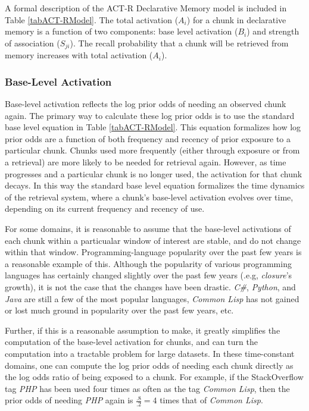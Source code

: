 \documentclass[man]{apa6}
\begin{document}
A formal description of the ACT-R Declarative Memory model is included in Table \ref{tabACT-RModel}.
The total activation ($A_{i}$) for a chunk in declarative memory is a function of two components: base level activation ($B_{i}$) and strength of association ($S_{ji}$).
The recall probability that a chunk will be retrieved from memory increases with total activation ($A_{i}$).

\subsubsection{Base-Level Activation}

Base-level activation reflects the log prior odds of needing an observed chunk again.
The primary way to calculate these log prior odds is to use the standard base level equation in Table \ref{tabACT-RModel}.
This equation formalizes how log prior odds are a function of both frequency and recency of prior exposure to a particular chunk.
Chunks used more frequently (either through exposure or from a retrieval) are more likely to be needed for retrieval again.
However, as time progresses and a particular chunk is no longer used, the activation for that chunk decays.
In this way the standard base level equation formalizes the time dynamics of the retrieval system, where a chunk's base-level activation evolves over time, depending on its current frequency and recency of use.

For some domains, it is reasonable to assume that the base-level activations of each chunk within a particualar window of interest are stable, and do not change within that window.
Programming-language popularity over the past few years is a reasonable example of this.
Although the popularity of various programming languages has certainly changed slightly over the past few years (.e.g, \emph{closure}'s growth), it is not the case that the changes have been drastic.
\emph{C\#}, \emph{Python}, and \emph{Java} are still a few of the most popular languages, \emph{Common Lisp} has not gained or lost much ground in popularity over the past few years, etc.

Further, if this is a reasonable assumption to make, it greatly simplifies the computation of the base-level activation for chunks, and can turn the computation into a tractable problem for large datasets.
In these time-constant domains, one can compute the log prior odds of needing each chunk directly as the log odds ratio of being exposed to a chunk.
For example, if the StackOverflow tag \emph{PHP} has been used four times as often as the tag \emph{Common Lisp}, then the prior odds of needing \emph{PHP} again is $\frac{.8}{.2}=4$ times that of \emph{Common Lisp}.
\end{document}
